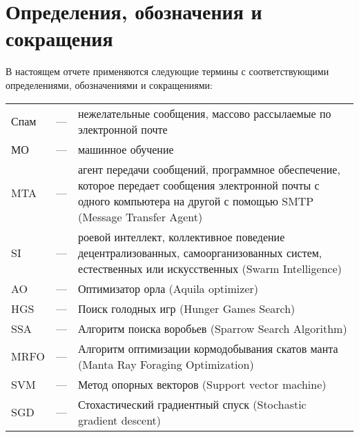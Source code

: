 \chapter*{Определения, обозначения и сокращения}

В настоящем отчете применяются следующие термины с соответствующими определениями, 
обозначениями и сокращениями:

\begingroup
\setlength{\baselineskip}{1.5em}
\renewcommand{\arraystretch}{1.5}
\begin{table}[ht]
    \begin{tabular}{ p{} p{} p{} } 
        Спам & — & нежелательные сообщения, массово рассылаемые по электронной почте \\
        МО & — & машинное обучение \\
        MTA & — & агент передачи сообщений, программное обеспечение, которое передает сообщения электронной почты с одного компьютера на другой с помощью SMTP (Message Transfer Agent) \\
        SI & — & роевой интеллект, коллективное поведение 
        децентрализованных, самоорганизованных систем, естественных или 
        искусственных (Swarm Intelligence) \\
        AO & — & Оптимизатор орла (Aquila optimizer) \\
        HGS & — & Поиск голодных игр (Hunger Games Search) \\
        SSA & — & Алгоритм поиска воробьев (Sparrow Search Algorithm) \\
        MRFO & — & Алгоритм оптимизации кормодобывания скатов манта (Manta Ray Foraging Optimization) \\
        SVM & — & Метод опорных векторов (Support vector machine) \\
        SGD & — & Стохастический градиентный спуск (Stochastic gradient descent) \\
    \end{tabular} 
\end{table}
\endgroup